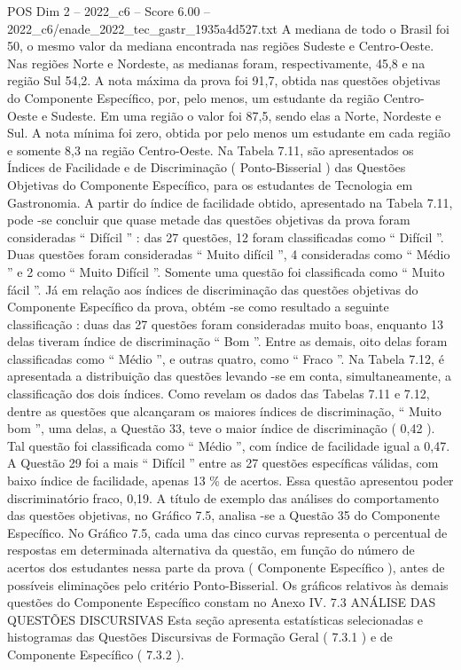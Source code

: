 \begin{textsample}{POS Dim 2 – 2022\_c6 – Score 6.00 – 2022\_c6/enade\_2022\_tec\_gastr\_1935a4d527.txt}
A mediana de todo o Brasil foi 50, o mesmo valor da mediana encontrada nas regiões Sudeste e Centro-Oeste.
Nas regiões Norte e Nordeste, as medianas foram, respectivamente, 45,8 e na região Sul 54,2.
A nota máxima da prova foi 91,7, obtida nas questões objetivas do Componente Específico, por, pelo menos, um estudante da região Centro-Oeste e Sudeste.
Em uma região o valor foi 87,5, sendo elas a Norte, Nordeste e Sul.
A nota mínima foi zero, obtida por pelo menos um estudante em cada região e somente 8,3 na região Centro-Oeste.
Na Tabela 7.11, são apresentados os Índices de Facilidade e de Discriminação ( Ponto-Bisserial ) das Questões Objetivas do Componente Específico, para os estudantes de Tecnologia em Gastronomia.
A partir do índice de facilidade obtido, apresentado na Tabela 7.11, pode -se concluir que quase metade das questões objetivas da prova foram consideradas “ Difícil ” : das 27 questões, 12 foram classificadas como “ Difícil ”.
Duas questões foram consideradas “ Muito difícil ”, 4 consideradas como “ Médio ” e 2 como “ Muito Difícil ”.
Somente uma questão foi classificada como “ Muito fácil ”.
Já em relação aos índices de discriminação das questões objetivas do Componente Específico da prova, obtém -se como resultado a seguinte classificação : duas das 27 questões foram consideradas muito boas, enquanto 13 delas tiveram índice de discriminação “ Bom ”.
Entre as demais, oito delas foram classificadas como “ Médio ”, e outras quatro, como “ Fraco ”.
Na Tabela 7.12, é apresentada a distribuição das questões levando -se em conta, simultaneamente, a classificação dos dois índices.
Como revelam os dados das Tabelas 7.11 e 7.12, dentre as questões que alcançaram os maiores índices de discriminação, “ Muito bom ”, uma delas, a Questão 33, teve o maior índice de discriminação ( 0,42 ).
Tal questão foi classificada como “ Médio ”, com índice de facilidade igual a 0,47.
A Questão 29 foi a mais “ Difícil ” entre as 27 questões específicas válidas, com baixo índice de facilidade, apenas 13 \% de acertos.
Essa questão apresentou poder discriminatório fraco, 0,19.
A título de exemplo das análises do comportamento das questões objetivas, no Gráfico 7.5, analisa -se a Questão 35 do Componente Específico.
No Gráfico 7.5, cada uma das cinco curvas representa o percentual de respostas em determinada alternativa da questão, em função do número de acertos dos estudantes nessa parte da prova ( Componente Específico ), antes de possíveis eliminações pelo critério Ponto-Bisserial.
Os gráficos relativos às demais questões do Componente Específico constam no Anexo IV. 7.3 ANÁLISE DAS QUESTÕES DISCURSIVAS Esta seção apresenta estatísticas selecionadas e histogramas das Questões Discursivas de Formação Geral ( 7.3.1 ) e de Componente Específico ( 7.3.2 ).

\end{textsample}

